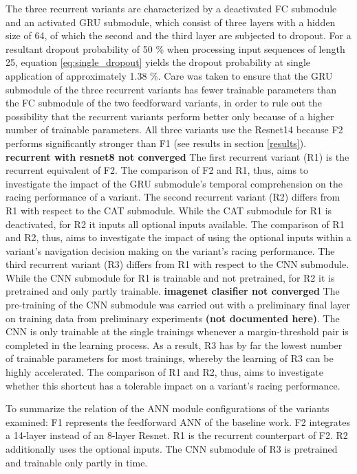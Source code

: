 The three recurrent variants
are characterized by a deactivated FC submodule and 
an activated GRU submodule,
which consist of three layers
with a hidden size of 64,
of which the second and the third layer
are subjected to dropout.
For a resultant dropout probability of 50 \%
when processing input sequences of length 25,
equation \ref{eq:single_dropout} yields the dropout probability 
at single application of approximately 1.38 \%.
Care was taken to ensure that the GRU submodule 
of the three recurrent variants has fewer trainable parameters
than the FC submodule of the two feedforward variants,
in order to rule out the possibility 
that the recurrent variants perform better only 
because of a higher number of trainable parameters.
All three variants use the Resnet14 
because F2 performs significantly stronger than F1
(see results in section \ref{results}).
\textbf{recurrent with resnet8 not converged}
The first recurrent variant (R1)
is the recurrent equivalent of F2.
The comparison of F2 and R1, thus,
aims to investigate the impact of the GRU submodule's 
temporal comprehension on the racing performance of a variant.
The second recurrent variant (R2) differs 
from R1 with respect to the CAT submodule.
While the CAT submodule for R1 is deactivated,
for R2 it inputs
all optional inputs available.
The comparison of R1 and R2, thus,
aims to investigate the impact of 
using the optional inputs
within a variant's navigation decision making
on the variant's racing performance.
The third recurrent variant (R3) differs 
from R1 with respect to the CNN submodule.
While the CNN submodule for R1 is trainable and not pretrained,
for R2 it is pretrained and only partly trainable.
\textbf{imagenet clasifier not converged}
The pre-training of the CNN submodule
was carried out with a preliminary final layer
on training data from 
preliminary experiments \textbf{(not documented here)}.
The CNN is only trainable at the single trainings
whenever a margin-threshold pair is completed in the learning process.
As a result, R3 has by far the lowest number of trainable parameters
for most trainings, whereby 
the learning of R3 can be highly accelerated.
The comparison of R1 and R2, thus,
aims to investigate 
whether this shortcut
has a tolerable impact on a
variant's racing performance.

To summarize the relation of the ANN module configurations of the variants examined: 
F1 represents the feedforward ANN of the baseline work.
F2 integrates a 14-layer instead of an 8-layer Resnet.
R1 is the recurrent counterpart of F2.
R2 additionally uses the optional inputs.
The CNN submodule of R3 is pretrained  
and trainable only partly in time.

